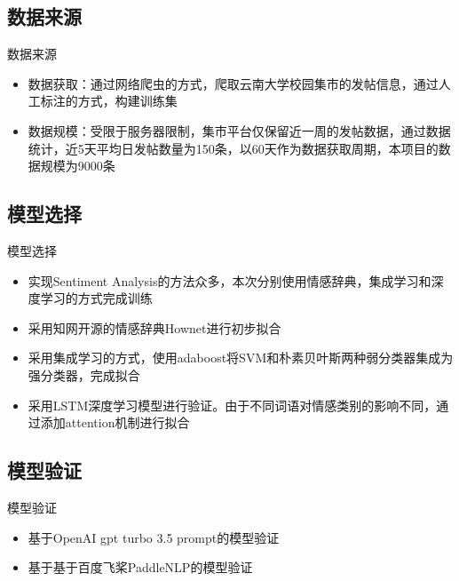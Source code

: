 \documentclass[UTF8]{ctexbeamer}
\begin{document}
\subsection{数据来源}
\begin{frame}{数据来源}
  \begin{itemize}
  \item {
    数据获取：通过网络爬虫的方式，爬取云南大学校园集市的发帖信息，通过人工标注的方式，构建训练集
  }
  \item {
    数据规模：受限于服务器限制，集市平台仅保留近一周的发帖数据，通过数据统计，近5天平均日发帖数量为150条，以60天作为数据获取周期，本项目的数据规模为9000条
  }
  \end{itemize}
\end{frame}

\subsection{模型选择}

\begin{frame}{模型选择}
   \begin{itemize}
  \item {
    实现Sentiment Analysis的方法众多，本次分别使用情感辞典，集成学习和深度学习的方式完成训练
  }
  \item {
    采用知网开源的情感辞典Hownet进行初步拟合
  }
  \item {
    采用集成学习的方式，使用adaboost将SVM和朴素贝叶斯两种弱分类器集成为强分类器，完成拟合
  }
  \item {
   采用LSTM深度学习模型进行验证。由于不同词语对情感类别的影响不同，通过添加attention机制进行拟合
  }
  \end{itemize}
\end{frame}

\subsection{模型验证}
\begin{frame}{模型验证}
  \begin{itemize}
  \item {
    基于OpenAI gpt turbo 3.5 prompt的模型验证
  }
  \item {
    基于基于百度飞桨PaddleNLP的模型验证
  }
  \end{itemize}
\end{frame}




\end{document}
